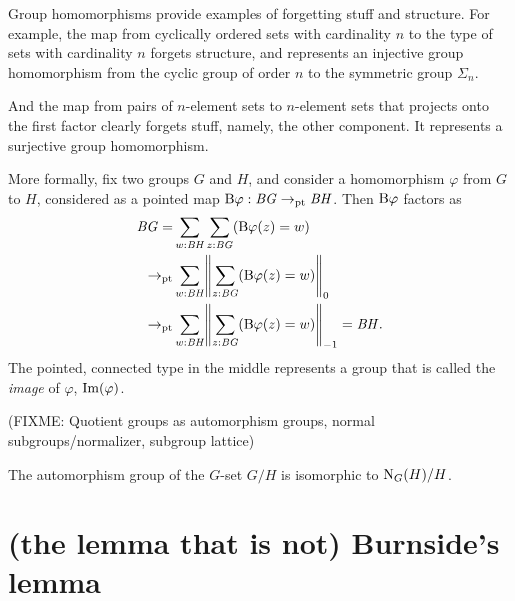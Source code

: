 Group homomorphisms provide examples of forgetting stuff and structure.
For example, the map from cyclically ordered sets with cardinality $n$
to the type of sets with cardinality $n$ forgets structure,
and represents an injective group homomorphism from the cyclic
group of order $n$ to the symmetric group $\Sigma_n$.

And the map from pairs of $n$-element sets to $n$-element sets
that projects onto the first factor clearly forgets stuff,
namely, the other component.
It represents a surjective group homomorphism.

More formally, fix two groups $G$ and $H$,
and consider a homomorphism $\varphi$ from $G$ to $H$,
considered as a pointed map $\mathrm{B}\varphi : \mathit{B}\mathit{G} \to_{\mathrm{pt}} \mathit{B}\mathit{H}$.
Then $\mathrm{B}\varphi$ factors as
\begin{align*}
  \BG
  = &\sum_{w:\BH}\sum_{z:\BG}(\B\varphi(z)=w)\\
  \to_\pt &\sum_{w:\BH}\Trunc*{\sum_{z:\BG}(\B\varphi(z)=w)}_0\\
  \to_\pt &\sum_{w:\BH}\Trunc*{\sum_{z:\BG}(\B\varphi(z)=w)}_{-1} = \BH.
\end{align*}
The pointed, connected type in the middle represents a group
that is called the \emph{image} of $\varphi$, $\Img(\varphi)$.


(FIXME: Quotient groups as automorphism groups, normal subgroups/normalizer, subgroup lattice)

\begin{lemma}
  \label{lem:aut-orbit}
  The automorphism group of the $G$-set $G/H$ is isomorphic to $\mathrm{N}_G(H)/H$.
\end{lemma}

\section{(the lemma that is not) Burnside's lemma}
\label{sec:burnsides-lemma}
\label{lem:burnsides-lemma}

